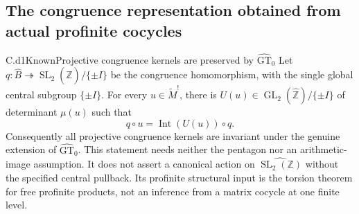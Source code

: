 \subsection{The congruence representation obtained from actual profinite cocycles}

\begin{claim}{C.d1}{Known}{Projective congruence kernels are preserved by $\widehat{\mathrm{GT}}_0$}
Let $q:\widehat B\twoheadrightarrow
\operatorname{SL}_2(\widehat{\mathbb Z})/\{\pm I\}$ be the congruence homomorphism, with the single global central subgroup $\{\pm I\}$. For every $u\in\widetilde M^!$, there is $U(u)\in\operatorname{GL}_2(\widehat{\mathbb Z})/\{\pm I\}$ of determinant $\mu(u)$ such that
\[
 q\circ u=\operatorname{Int}(U(u))\circ q.
\]
Consequently all projective congruence kernels are invariant under the genuine extension of $\widehat{\mathrm{GT}}_0$. This statement needs neither the pentagon nor an arithmetic-image assumption. It does not assert a canonical action on $\widehat{\operatorname{SL}_2(\mathbb Z)}$ without the specified central pullback. Its profinite structural input is the torsion theorem for free profinite products, not an inference from a matrix cocycle at one finite level.
\end{claim}


